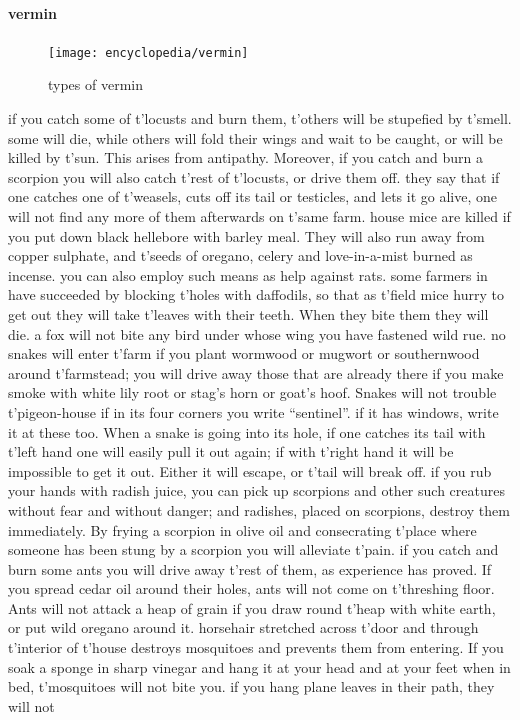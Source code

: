 \paragraph{vermin}\begin{figure}\centering\texttt{[image: encyclopedia/vermin]}\caption{types of vermin}\end{figure}   if you catch some of t'\allowbreak locusts and burn them, t'\allowbreak others will be stupefied by t'\allowbreak smell. some will die, while others will fold their wings and wait to be caught, or will be killed by t'\allowbreak sun. This arises from antipathy. Moreover, if you catch and burn a scorpion you will also catch t'\allowbreak rest of t'\allowbreak locusts, or drive them off.  they say that if one catches one of t'\allowbreak weasels, cuts off its tail or testicles, and lets it go alive, one will not find any more of them afterwards on t'\allowbreak same farm.  house mice are killed if you put down black hellebore with barley meal. They will also run away from copper sulphate, and t'\allowbreak seeds of oregano, celery and love-in-a-mist burned as incense. you can also employ such means as help against rats.  some farmers in  have succeeded by blocking t'\allowbreak holes with daffodils, so that as t'\allowbreak field mice hurry to get out they will take t'\allowbreak leaves with their teeth. When they bite them they will die.  a fox will not bite any bird under whose wing you have fastened wild rue.  no snakes will enter t'\allowbreak farm if you plant wormwood or mugwort or southernwood around t'\allowbreak farmstead; you will drive away those that are already there if you make smoke with white lily root or stag’s horn or goat’s hoof. Snakes will not trouble t'\allowbreak pigeon-house if in its four corners you write “sentinel”. if it has windows, write it at these too. When a snake is going into its hole, if one catches its tail with t'\allowbreak left hand one will easily pull it out again; if with t'\allowbreak right hand it will be impossible to get it out. Either it will escape, or t'\allowbreak tail will break off.  if you rub your hands with radish juice, you can pick up scorpions and other such creatures without fear and without danger; and radishes, placed on scorpions, destroy them immediately. By frying a scorpion in olive oil and consecrating t'\allowbreak place where someone has been stung by a scorpion you will alleviate t'\allowbreak pain.  if you catch and burn some ants you will drive away t'\allowbreak rest of them, as experience has proved. If you spread cedar oil around their holes, ants will not come on t'\allowbreak threshing floor. Ants will not attack a heap of grain if you draw round t'\allowbreak heap with white earth, or put wild oregano around it.  horsehair stretched across t'\allowbreak door and through t'\allowbreak interior of t'\allowbreak house destroys mosquitoes and prevents them from entering. If you soak a sponge in sharp vinegar and hang it at your head and at your feet when in bed, t'\allowbreak mosquitoes will not bite you.  if you hang plane leaves in their path, they will not 